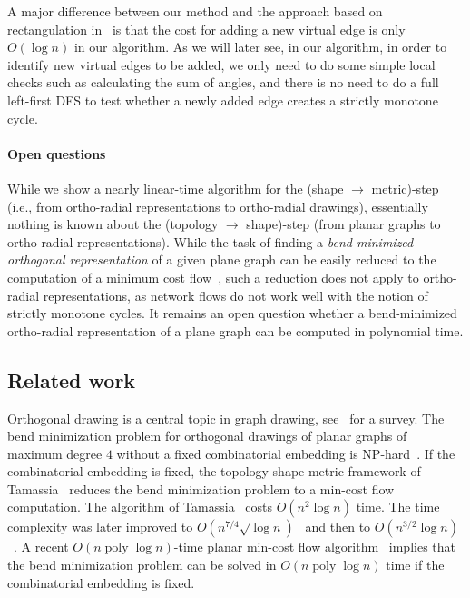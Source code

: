 \documentclass{theoretics}
\newcommand{\poly}{\operatorname{poly}}
\begin{document}
A major difference between our method and the approach based on rectangulation in~\cite{barth2023topology} is that the cost for adding a new virtual edge is only $O(\log n)$ in our algorithm. As we will later see, in our algorithm, in order to identify new virtual edges to be added, we only need to do some simple local checks such as calculating the sum of angles, and there is no need to do a full left-first DFS to test whether a newly added edge creates a strictly monotone cycle. 

\paragraph{Open questions} While we show a nearly linear-time algorithm for the (shape $\rightarrow$ metric)-step (i.e., from ortho-radial representations to ortho-radial drawings), essentially nothing is known about the (topology $\rightarrow$ shape)-step (from planar graphs to ortho-radial representations). 
While the task of finding a \emph{bend-minimized orthogonal representation} of a given plane graph can be easily reduced to the computation of a minimum cost flow~\cite{tamassia1987embedding}, such a reduction does not apply to ortho-radial representations, as network flows do not work well with the notion of strictly monotone cycles. It remains an open question whether a bend-minimized ortho-radial representation of a plane graph can be computed in polynomial time.
 
 

\subsection{Related work}
Orthogonal drawing is a central topic in graph drawing, see~\cite{DG13} for a survey. The bend minimization problem for orthogonal drawings of planar graphs of maximum degree $4$ without a fixed combinatorial embedding is NP-hard~\cite{formann1993drawing,GT96}. If the combinatorial embedding is fixed, the topology-shape-metric framework of Tamassia~\cite{tamassia1987embedding} reduces the bend minimization problem to a min-cost flow computation. The algorithm of Tamassia~\cite{tamassia1987embedding} costs $O(n^2 \log n)$ time. The time complexity was later improved to $O\left(n^{7/4} \sqrt{\log n}\right)$~\cite{GT96} and then to $O\left(n^{3/2} \log n\right)$~\cite{CK12}. A recent $O(n \poly \log n)$-time planar min-cost flow algorithm~\cite{dong2022nested} implies that the bend minimization problem can be solved in $O(n \poly \log n)$ time if the combinatorial embedding is fixed.
\end{document}
